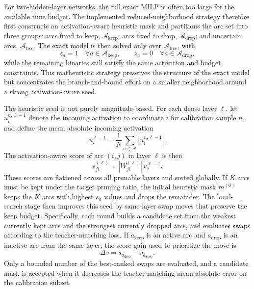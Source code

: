 For two-hidden-layer networks, the full exact MILP is often too large for the available time budget. The implemented reduced-neighborhood strategy therefore first constructs an activation-aware heuristic mask and partitions the arc set into three groups: arcs fixed to keep, $\mathcal{A}_{\mathrm{keep}}$; arcs fixed to drop, $\mathcal{A}_{\mathrm{drop}}$; and uncertain arcs, $\mathcal{A}_{\mathrm{free}}$. The exact model is then solved only over $\mathcal{A}_{\mathrm{free}}$, with
\begin{equation}
    z_a = 1 \quad \forall a\in\mathcal{A}_{\mathrm{keep}}, \qquad
    z_a = 0 \quad \forall a\in\mathcal{A}_{\mathrm{drop}},
    \label{eq:reduced_neighborhood_fixings}
\end{equation}
while the remaining binaries still satisfy the same activation and budget constraints. This matheuristic strategy preserves the structure of the exact model but concentrates the branch-and-bound effort on a smaller neighborhood around a strong activation-aware seed.

The heuristic seed is not purely magnitude-based. For each dense layer $\ell$, let $u_{i}^{n,\ell-1}$ denote the incoming activation to coordinate $i$ for calibration sample $n$, and define the mean absolute incoming activation
\begin{equation}
    \bar{u}_{i}^{\ell-1}=\frac{1}{N}\sum_{n\in\mathcal{N}}\left|u_{i}^{n,\ell-1}\right|.
    \label{eq:activation_mean}
\end{equation}
The activation-aware score of arc $(i,j)$ in layer $\ell$ is then
\begin{equation}
    s_{ji}^{(\ell)}=\left|W_{ji}^{(\ell)}\right|\,\bar{u}_{i}^{\ell-1}.
    \label{eq:activation_aware_score}
\end{equation}
These scores are flattened across all prunable layers and sorted globally. If $K$ arcs must be kept under the target pruning ratio, the initial heuristic mask $m^{(0)}$ keeps the $K$ arcs with highest $s_a$ values and drops the remainder. The local-search stage then improves this seed by same-layer swap moves that preserve the keep budget. Specifically, each round builds a candidate set from the weakest currently kept arcs and the strongest currently dropped arcs, and evaluates swaps according to the teacher-matching loss. If $a_{\mathrm{keep}}$ is an active arc and $a_{\mathrm{drop}}$ is an inactive arc from the same layer, the score gain used to prioritize the move is
\begin{equation}
    \Delta s = s_{a_{\mathrm{drop}}} - s_{a_{\mathrm{keep}}}.
    \label{eq:score_gain}
\end{equation}
Only a bounded number of the best-ranked swaps are evaluated, and a candidate mask is accepted when it decreases the teacher-matching mean absolute error on the calibration subset.

